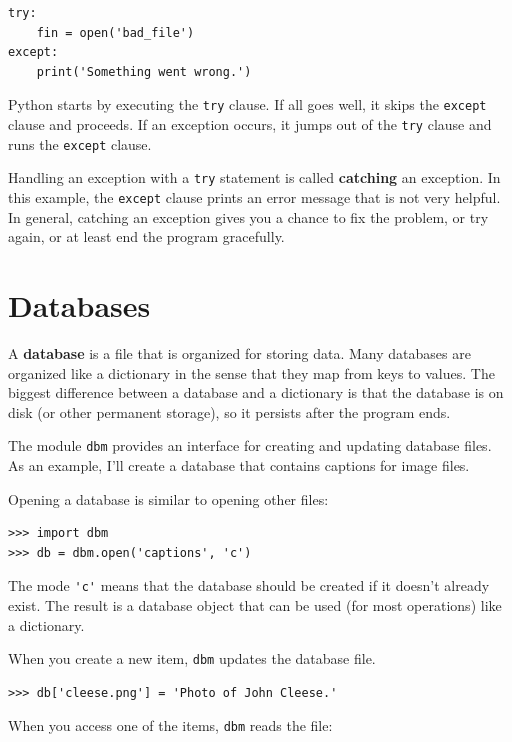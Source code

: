 \documentclass[10pt]{book}
\begin{document}
\begin{verbatim}
try:    
    fin = open('bad_file')
except:
    print('Something went wrong.')
\end{verbatim}
%
Python starts by executing the {\tt try} clause.  If all goes
well, it skips the {\tt except} clause and proceeds.  If an
exception occurs, it jumps out of the {\tt try} clause and
runs the {\tt except} clause.

Handling an exception with a {\tt try} statement is called {\bf
catching} an exception.  In this example, the {\tt except} clause
prints an error message that is not very helpful.  In general,
catching an exception gives you a chance to fix the problem, or try
again, or at least end the program gracefully.


\section{Databases}

A {\bf database} is a file that is organized for storing data.  Many
databases are organized like a dictionary in the sense that they map
from keys to values.  The biggest difference between a database and a
dictionary is that the database is on disk (or other permanent
storage), so it persists after the program ends.   

The module {\tt dbm} provides an interface for creating
and updating database files.
As an example, I'll create a database
that contains captions for image files.

Opening a database is similar to opening other files:

\begin{verbatim}
>>> import dbm
>>> db = dbm.open('captions', 'c')
\end{verbatim}
%
The mode \verb"'c'" means that the database should be created if
it doesn't already exist.  The result is a database object
that can be used (for most operations) like a dictionary.

When you create a new item, {\tt dbm} updates the database file.

\begin{verbatim}
>>> db['cleese.png'] = 'Photo of John Cleese.'
\end{verbatim}
%
When you access one of the items, {\tt dbm} reads the file:
\end{document}
